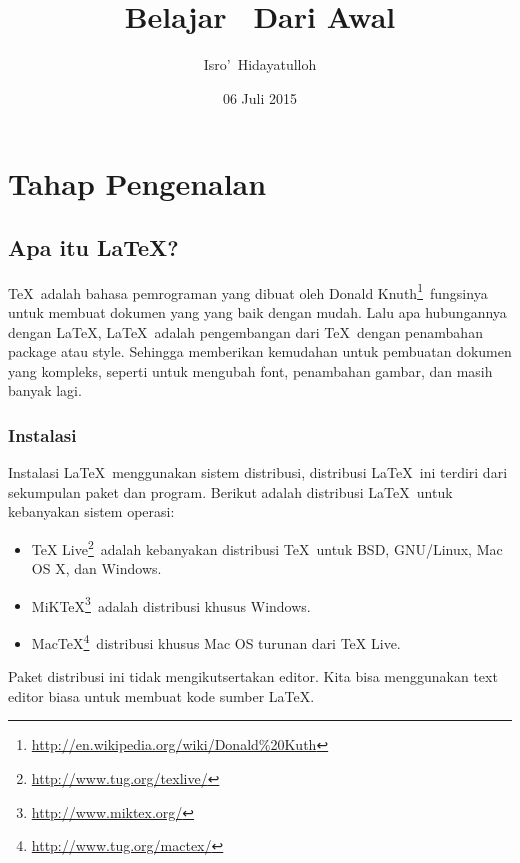 \documentclass[12pt,oneside]{book}
\title{Belajar \LaTeXe\ Dari Awal}
\author{Isro\rq\ Hidayatulloh}
\date{06 Juli 2015}
\begin{document}
\renewcommand{\contentsname}{Daftar Isi}
\renewcommand{\partname}{Bagian}
\renewcommand{\chaptername}{BAB}
\renewcommand{\figurename}{Gambar}
\renewcommand{\tablename}{Tabel}
\renewcommand{\bibname}{Daftar Pustaka}
\renewcommand{\listtablename}{Daftar Tabel}
\renewcommand{\listfigurename}{Daftar Gambar}
\setcounter{secnumdepth}{2}
\frontmatter

\maketitle
\tableofcontents

\mainmatter
\part{Tahap Pengenalan}%

\chapter{Apa itu \LaTeX?}
\TeX\ adalah bahasa pemrograman yang dibuat oleh Donald Knuth\footnote{\url{http://en.wikipedia.org/wiki/Donald\%20Kuth}}\ fungsinya untuk membuat dokumen yang yang baik dengan mudah. Lalu apa hubungannya dengan \LaTeX , \LaTeX\ adalah pengembangan dari \TeX\ dengan penambahan package atau style. Sehingga memberikan kemudahan untuk pembuatan dokumen yang kompleks, seperti untuk mengubah font, penambahan gambar, dan masih banyak lagi.

\section{Instalasi}
Instalasi \LaTeX\ menggunakan sistem distribusi, distribusi \LaTeX\ ini terdiri dari sekumpulan paket dan program. Berikut adalah distribusi \LaTeX\ untuk kebanyakan sistem operasi:
\begin{itemize}
	\item TeX Live\footnote{\url{http://www.tug.org/texlive/}}\ adalah kebanyakan distribusi \TeX\ untuk BSD, GNU/Linux, Mac OS X, dan Windows.
	\item MiKTeX\footnote{\url{http://www.miktex.org/}}\ adalah distribusi khusus Windows.
	\item MacTeX\footnote{\url{http://www.tug.org/mactex/}}\ distribusi khusus Mac OS turunan dari TeX Live.
\end{itemize}
Paket distribusi ini tidak mengikutsertakan editor. Kita bisa menggunakan text editor biasa untuk membuat kode sumber \LaTeX .
\end{document}
